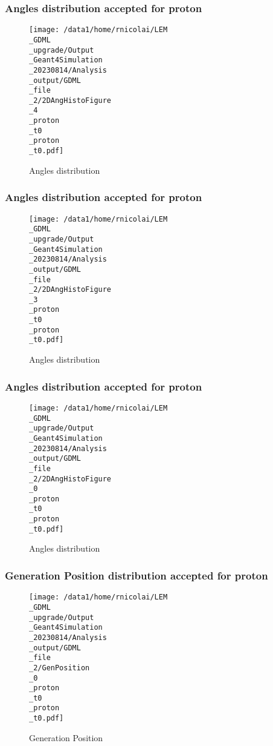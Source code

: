 \documentclass[8pt]{beamer}
\begin{document}
            \begin{frame}
                \frametitle{Angles distribution accepted for proton}
            
        \begin{figure}[h]
            \centering
            \texttt{[image: /data1/home/rnicolai/LEM\\\_GDML\\\_upgrade/Output\\\_Geant4Simulation\\\_20230814/Analysis\\\_output/GDML\\\_file\\\_2/2DAngHistoFigure\\\_4\\\_proton\\\_t0\\\_proton\\\_t0.pdf]}
            \caption{Angles distribution}
        \end{figure}
        
            \end{frame}
            
            \begin{frame}
                \frametitle{Angles distribution accepted for proton}
            
        \begin{figure}[h]
            \centering
            \texttt{[image: /data1/home/rnicolai/LEM\\\_GDML\\\_upgrade/Output\\\_Geant4Simulation\\\_20230814/Analysis\\\_output/GDML\\\_file\\\_2/2DAngHistoFigure\\\_3\\\_proton\\\_t0\\\_proton\\\_t0.pdf]}
            \caption{Angles distribution}
        \end{figure}
        
            \end{frame}
            
            \begin{frame}
                \frametitle{Angles distribution accepted for proton}
            
        \begin{figure}[h]
            \centering
            \texttt{[image: /data1/home/rnicolai/LEM\\\_GDML\\\_upgrade/Output\\\_Geant4Simulation\\\_20230814/Analysis\\\_output/GDML\\\_file\\\_2/2DAngHistoFigure\\\_0\\\_proton\\\_t0\\\_proton\\\_t0.pdf]}
            \caption{Angles distribution}
        \end{figure}
        
            \end{frame}
            
            \begin{frame}
                \frametitle{Generation Position distribution accepted for proton}
            
        \begin{figure}[h]
            \centering
            \texttt{[image: /data1/home/rnicolai/LEM\\\_GDML\\\_upgrade/Output\\\_Geant4Simulation\\\_20230814/Analysis\\\_output/GDML\\\_file\\\_2/GenPosition\\\_0\\\_proton\\\_t0\\\_proton\\\_t0.pdf]}
            \caption{Generation Position}
        \end{figure}
        
            \end{frame}
            
\end{document}
